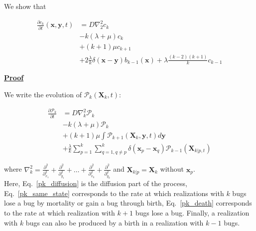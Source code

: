 We show that

\begin{subequations} 
\begin{align}
\frac{\partial c_{k}}{\partial t}(\boldsymbol{x},\boldsymbol{y},t) & =D\nabla_{2}^{2}c_{k}\label{ck_diffusion-1}\\
 & -k(\lambda+\mu)c_{k}\label{ck_same_state-1}\\
 & +(k+1)\mu c_{k+1}\label{ck_death-1}\\
 & +2\frac{\lambda}{k}\delta(\boldsymbol{x}-\boldsymbol{y})b_{k-1}(\boldsymbol{x})+\lambda\frac{(k-2)(k+1)}{k}c_{k-1}\label{ck_birth-1}
\end{align}
\end{subequations}

\vspace{2em}

\textbf{\underline{Proof}}
~

We write the evolution of $\mathcal{P}_{k}(\boldsymbol{X}_{k},t)$:

\begin{subequations} 
\begin{align}
\frac{\partial\mathcal{P}_{k}}{\partial t} & =D\nabla_{k}^{2}\mathcal{P}_{k}\label{pk_diffusion}\\
 & -k(\lambda+\mu)\mathcal{P}_{k}\label{pk_same_state}\\
 & +(k+1)\mu\int\mathcal{P}_{k+1}(\boldsymbol{X}_{k},\boldsymbol{y},t)d\boldsymbol{y}\label{pk_death}\\
 & +\frac{\lambda}{k}\sum_{p=1}^{k}\sum_{q=1,q\neq p}^{k}\delta({\boldsymbol{x}_p-\boldsymbol{x}_q})\mathcal{P}_{k-1}(\boldsymbol{X}_{k|p,t})\label{pk_birth}
\end{align}
\end{subequations}

where $\nabla_{k}^{2}=\frac{\partial^{2}}{\partial_{x_{1}}^{2}}+\frac{\partial^{2}}{\partial_{y_{1}}^{2}}+\ldots+\frac{\partial^{2}}{\partial_{x_{k}}^{2}}+\frac{\partial^{2}}{\partial_{y_{k}}^{2}}$ and $\boldsymbol{X}_{k|p}=\boldsymbol{X}_{k}$
without $\boldsymbol{x}_{p}$. \\

Here, Eq.~\ref{pk_diffusion} is the diffusion part of the process, 
Eq.~\ref{pk_same_state} corresponds to the rate at which realizations with $k$ bugs lose a bug by mortality or gain a bug through birth,  Eq.~\ref{pk_death} corresponds to the rate at which realization with $k+1$ bugs lose a bug. Finally, a realization with $k$ bugs can also be produced by a birth in a realization with $k-1$ bugs. \\

